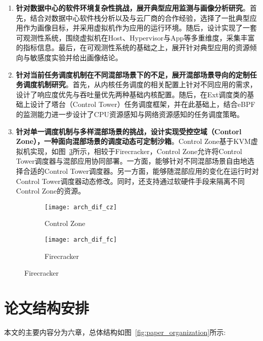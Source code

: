 \begin{enumerate}
    \item \textbf{针对数据中心的软件环境复杂性挑战，展开典型应用监测与画像分析研究}。首先，结合对数据中心软件栈分析以及与云厂商的合作经验，选择了一批典型应用作为画像目标，并采用虚拟机作为应用的运行环境。随后，设计实现了一套可观测性系统，围绕虚拟机在Host、Hypervisor与App等多重维度，采集丰富的指标信息。最后，在可观测性系统的基础之上，展开针对典型应用的资源倾向与敏感度实验并给出画像结论。
    \item \textbf{针对当前任务调度机制在不同混部场景下的不足，展开混部场景导向的定制任务调度机制研究}。首先，从内核任务调度的相关配置上针对不同应用的需求，设计了响应度优先与吞吐量优先两种基础内核配置。随后，在Ext调度类的基础上设计了塔台（Control Tower）任务调度框架，并在此基础上，结合eBPF的监测能力进一步设计了CPU资源感知与网络资源感知的任务调度策略。
    \item \textbf{针对单一调度机制与多样混部场景的挑战，设计实现受控空域（Contorl Zone），一种面向混部场景的调度动态可定制沙箱}。Control Zone基于KVM虚拟机实现，如图~\ref{fig:arch_dif}所示，相较于Firecracker\citep{agache2020firecracker}，Control Zone允许将Control Tower调度器与混部应用协同部署。一方面，能够针对不同混部场景自由地选择合适的Control Tower调度器。另一方面，能够随混部应用的变化在运行时对Control Tower调度器动态修改。同时，还支持通过软硬件手段来隔离不同Control Zone的资源。
\end{enumerate}

\begin{figure}[!htbp]
    \centering
    \begin{subfigure}[b]{0.45\textwidth}
        \texttt{[image: arch\_dif\_cz]}
        \caption{Control Zone}
        \label{fig:arch_dif_cz}
    \end{subfigure}
    \hfill
    \begin{subfigure}[b]{0.45\textwidth}
        \texttt{[image: arch\_dif\_fc]}
        \caption{Firecracker}
        \label{fig:arch_dif_fc}
    \end{subfigure}
\label{fig:arch_dif}
\end{figure}

\section{论文结构安排}

本文的主要内容分为六章，总体结构如图~\ref{fig:paper_organization}所示:

